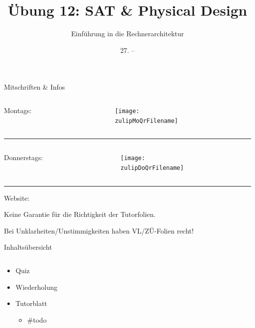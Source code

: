 \documentclass[
  german,            %
  aspectratio=169,    %
]{tumbeamer}
\title{Übung 12: SAT \& Physical Design}
\subtitle{Einführung in die Rechnerarchitektur}
\author{\theAuthorName}
\institute{\theGroupName\\\theSchoolName\\\theUniversityName}
\date{27. -- \DTMdisplaydate{2025}{01}{31}{-1}}
\begin{document}
\maketitle

\begin{frame}[c]{Mitschriften \& Infos}{}
  \begin{minipage}[t]{\textwidth}
    \begin{columns}[c]
      \begin{column}{0.8\textwidth}
        Montags: \href{\zulipMo}{\zulipMo}
      \end{column}
      \begin{column}{0.2\textwidth}
        \texttt{[image: \\zulipMoQrFilename]}
      \end{column}
    \end{columns}
  \end{minipage}
  \rule{\textwidth}{0.4pt}
  \begin{minipage}[t]{\textwidth}
    \begin{columns}[c]
      \begin{column}{0.8\textwidth}
        Donnerstags: \href{\zulipDo}{\zulipDo}
      \end{column}
      \begin{column}{0.2\textwidth}
        \texttt{[image: \\zulipDoQrFilename]}
      \end{column}
    \end{columns}
  \end{minipage}
  \ifdefined\myWebsite
  \rule{\textwidth}{0.4pt}
  \centering
  Website: \href{\myWebsite}{\myWebsite}
  \fi
\end{frame}

\begin{frame}[c]{}{}
  \begin{center}
    \LARGE  Keine Garantie für die Richtigkeit der Tutorfolien.

    \Large Bei Unklarheiten/Unstimmigkeiten haben VL/ZÜ-Folien recht!
  \end{center}
\end{frame}

\begin{frame}[c]{Inhaltsübersicht}{}
  \begin{columns}[c]
    \begin{column}{1\textwidth}
      \begin{itemize}
        \item Quiz
        \item Wiederholung
        \item Tutorblatt
        \begin{itemize}
			\item \#todo
        \end{itemize}
      \end{itemize}
    \end{column}
  \end{columns}
\end{frame}
\end{document}
